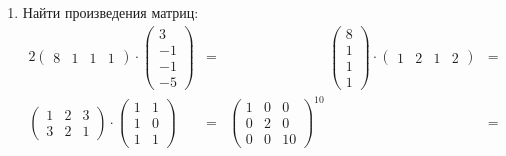 {\begin{enumerate}
        \item Найти произведения матриц:
        \begin{alignat*}{2}
            \begin{pmatrix}
                8 & 1 & 1 & 1
            \end{pmatrix}
            \cdot
            \begin{pmatrix}
                3 \\
                -1 \\
                -1 \\
                -5
            \end{pmatrix}
            &=
            & \hspace{3cm}
            \begin{pmatrix}
                8 \\
                1 \\
                1 \\
                1
            \end{pmatrix}
            \cdot
            \begin{pmatrix}
                1 & 2 & 1 & 2
            \end{pmatrix}
            &= \\[1em]
            \begin{pmatrix}
                1 & 2 & 3\\
                3 & 2 & 1
            \end{pmatrix}
            \cdot
            \begin{pmatrix}
                1 & 1 \\
                1 & 0 \\
                1 & 1
            \end{pmatrix}
            &=
            &
            \begin{pmatrix}
                1 & 0 & 0\\
                0 & 2 & 0\\
                0 & 0 & 10
            \end{pmatrix}
            ^{10}
            &=
        \end{alignat*}



\end{enumerate}}
